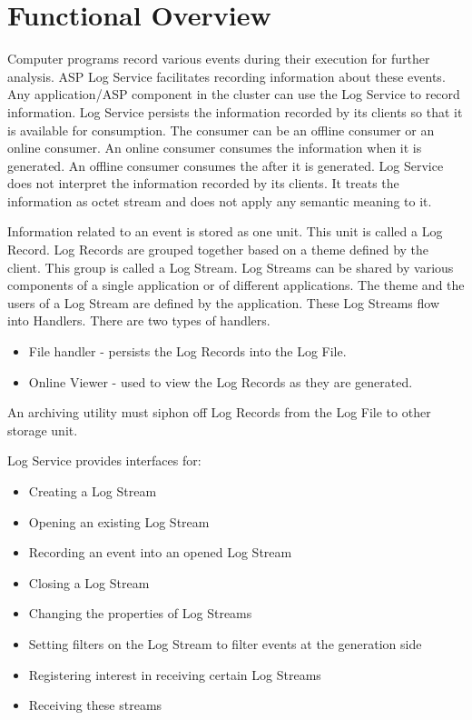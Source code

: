 \hypertarget{group__group26}{
\chapter{Functional Overview}
\label{group__group26}
}


\begin{flushleft}

Computer programs record various events during their execution for further analysis. ASP Log Service facilitates recording information about these events. Any application/ASP component in the cluster can use the Log Service to record information.
Log Service persists the information recorded by its clients so that it is available for consumption. The consumer can be an offline consumer or an 
online consumer. An online consumer consumes the information when it is generated. An offline consumer consumes the after it is generated. 
Log Service does not interpret the information recorded by its clients. It treats the information as octet stream and does not apply any semantic meaning
to it.
\par
Information related to an event is stored as one unit. This unit is called a Log Record. Log Records are grouped together based on a theme defined by
the client. This group is called a Log Stream. Log Streams can be shared by various components of a single application or of different applications.
The theme and the users of a Log Stream are defined by the application. These Log Streams flow into Handlers. There are two types of handlers.
\begin{itemize}
\item
File handler - persists the Log Records into the Log File. 
\item
Online Viewer - used to view the Log Records as they are generated. 
\end{itemize}
An archiving utility must siphon off Log Records from the Log File to other storage unit. 
\par
Log Service provides interfaces for:
\begin{itemize}
\item
Creating a Log Stream
\item
Opening an existing Log Stream
\item
Recording an event into an opened Log Stream
\item
Closing a Log Stream
\item
Changing the properties of Log Streams
\item
Setting filters on the Log Stream to filter events at the generation side 
\item
Registering interest in receiving certain Log Streams
\item
Receiving these streams
\end{itemize}




\end{flushleft}
